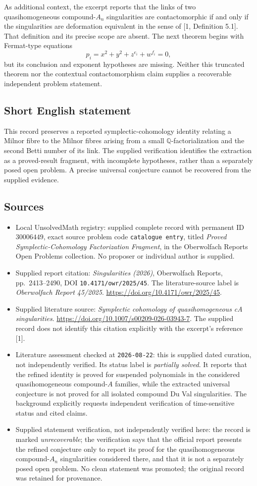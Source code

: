 \documentclass[11pt]{article}
\newcommand{\Q}{\mathbb{Q}}
\begin{document}
As additional context, the excerpt reports that the links of two quasihomogeneous compound-\(A_n\) singularities are contactomorphic if and only if the singularities are deformation equivalent in the sense of [1, Definition 5.1]. That definition and its precise scope are absent. The next theorem begins with Fermat-type equations
\[
p_i=x^2+y^2+z^{e_i}+w^{f_i}=0,
\]
but its conclusion and exponent hypotheses are missing. Neither this truncated theorem nor the contextual contactomorphism claim supplies a recoverable independent problem statement.
\subsection{Short English statement}
This record preserves a reported symplectic-cohomology identity relating a Milnor fibre to the Milnor fibres arising from a small \(\Q\)-factorialization and the second Betti number of its link. The supplied verification identifies the extraction as a proved-result fragment, with incomplete hypotheses, rather than a separately posed open problem. A precise universal conjecture cannot be recovered from the supplied evidence.
\subsection{Sources}
\begin{itemize}
\item Local UnsolvedMath registry: supplied complete record with permanent ID \(30006449\), exact source problem code \texttt{catalogue entry}, titled \emph{Proved Symplectic-Cohomology Factorization Fragment}, in the Oberwolfach Reports Open Problems collection. No proposer or individual author is supplied.
\item Supplied report citation: \emph{Singularities (2026)}, Oberwolfach Reports, pp.\ 2413--2490, DOI \texttt{10.4171/owr/2025/45}. The literature-source label is \emph{Oberwolfach Report 45/2025}. \url{https://doi.org/10.4171/owr/2025/45}.
\item Supplied literature source: \emph{Symplectic cohomology of quasihomogeneous cA singularities}. \url{https://doi.org/10.1007/s00209-026-03943-7}. The supplied record does not identify this citation explicitly with the excerpt's reference [1].
\item Literature assessment checked at \texttt{2026-08-22}: this is supplied dated curation, not independently verified. Its status label is \emph{partially solved}. It reports that the refined identity is proved for suspended polynomials in the considered quasihomogeneous compound-\(A\) families, while the extracted universal conjecture is not proved for all isolated compound Du Val singularities. The background explicitly requests independent verification of time-sensitive status and cited claims.
\item Supplied statement verification, not independently verified here: the record is marked \emph{unrecoverable}; the verification says that the official report presents the refined conjecture only to report its proof for the quasihomogeneous compound-\(A_n\) singularities considered there, and that it is not a separately posed open problem. No clean statement was promoted; the original record was retained for provenance.
\end{itemize}
\end{document}
